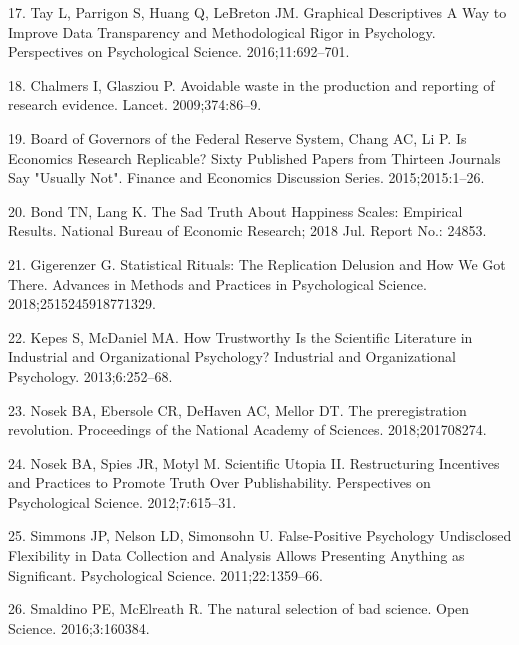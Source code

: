 \documentclass[english,man,floatsintext]{apa6}
\begin{document}
\leavevmode\hypertarget{ref-tayGraphicalDescriptivesWay2016}{}%
17. Tay L, Parrigon S, Huang Q, LeBreton JM. Graphical Descriptives A Way to Improve Data Transparency and Methodological Rigor in Psychology. Perspectives on Psychological Science. 2016;11:692--701.

\leavevmode\hypertarget{ref-chalmersAvoidableWasteProduction2009}{}%
18. Chalmers I, Glasziou P. Avoidable waste in the production and reporting of research evidence. Lancet. 2009;374:86--9.

\leavevmode\hypertarget{ref-boardofgovernorsofthefederalreservesystemEconomicsResearchReplicable2015}{}%
19. Board of Governors of the Federal Reserve System, Chang AC, Li P. Is Economics Research Replicable? Sixty Published Papers from Thirteen Journals Say "Usually Not". Finance and Economics Discussion Series. 2015;2015:1--26.

\leavevmode\hypertarget{ref-bondSadTruthHappiness2018}{}%
20. Bond TN, Lang K. The Sad Truth About Happiness Scales: Empirical Results. National Bureau of Economic Research; 2018 Jul. Report No.: 24853.

\leavevmode\hypertarget{ref-gigerenzerStatisticalRitualsReplication2018}{}%
21. Gigerenzer G. Statistical Rituals: The Replication Delusion and How We Got There. Advances in Methods and Practices in Psychological Science. 2018;2515245918771329.

\leavevmode\hypertarget{ref-kepesHowTrustworthyScientific2013}{}%
22. Kepes S, McDaniel MA. How Trustworthy Is the Scientific Literature in Industrial and Organizational Psychology? Industrial and Organizational Psychology. 2013;6:252--68.

\leavevmode\hypertarget{ref-nosekPreregistrationRevolution2018}{}%
23. Nosek BA, Ebersole CR, DeHaven AC, Mellor DT. The preregistration revolution. Proceedings of the National Academy of Sciences. 2018;201708274.

\leavevmode\hypertarget{ref-nosekScientificUtopiaII2012}{}%
24. Nosek BA, Spies JR, Motyl M. Scientific Utopia II. Restructuring Incentives and Practices to Promote Truth Over Publishability. Perspectives on Psychological Science. 2012;7:615--31.

\leavevmode\hypertarget{ref-simmonsFalsePositivePsychologyUndisclosed2011}{}%
25. Simmons JP, Nelson LD, Simonsohn U. False-Positive Psychology Undisclosed Flexibility in Data Collection and Analysis Allows Presenting Anything as Significant. Psychological Science. 2011;22:1359--66.

\leavevmode\hypertarget{ref-smaldinoNaturalSelectionBad2016}{}%
26. Smaldino PE, McElreath R. The natural selection of bad science. Open Science. 2016;3:160384.
\end{document}
